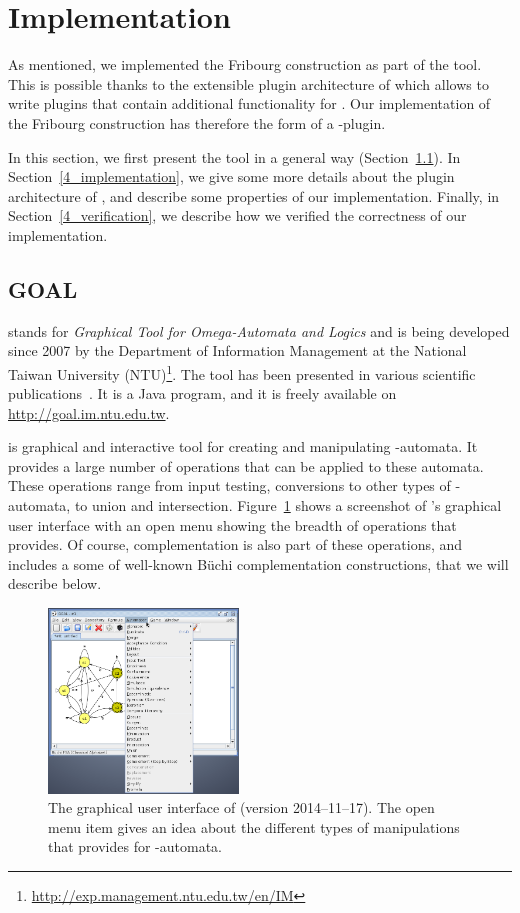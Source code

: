 \section{Implementation}
As mentioned, we implemented the Fribourg construction as part of the \goal{} tool. This is possible thanks to the extensible plugin architecture of \goal{} which allows to write plugins that contain additional functionality for \goal. Our implementation of the Fribourg construction has therefore the form of a \goal-plugin.

In this section, we first present the \goal{} tool in a general way (Section~\ref{4_goal}). In Section~\ref{4_implementation}, we give some more details about the plugin architecture of \goal, and describe some properties of our implementation. Finally, in Section~\ref{4_verification}, we describe how we verified the correctness of our implementation.


\subsection{GOAL}
\label{4_goal}
\goal{} stands for \textit{Graphical Tool for Omega-Automata and Logics} and is being developed since 2007 by the Department of Information Management at the National Taiwan University (NTU)\footnote{\url{http://exp.management.ntu.edu.tw/en/IM}}. The tool has been presented in various scientific publications~\cite{2007_goal}\cite{2008_goal_ext}\cite{2009_goal}\cite{2013_goal}. It is a Java program, and it is freely available on \url{http://goal.im.ntu.edu.tw}.

\goal{} is graphical and interactive tool for creating and manipulating \om-automata. It provides a large number of operations that can be applied to these automata. These operations range from input testing, conversions to other types of \om-automata, to union and intersection. Figure~\ref{goal_gui} shows a screenshot of \goal's graphical user interface with an open menu showing the breadth of operations that \goal{} provides. Of course, complementation is also part of these operations, and \goal{} includes a some of well-known Büchi complementation constructions, that we will describe below.

\begin{figure}[htb!]
\centering
\includegraphics[width=0.45\textwidth]{figures/goal.png}
\caption{The graphical user interface of \goal{} (version 2014--11--17). The open menu item gives an idea about the different types of manipulations that \goal{} provides for \om-automata.}
\label{goal_gui}
\end{figure}

